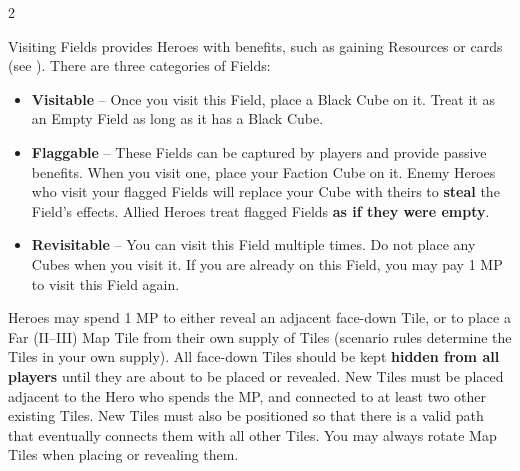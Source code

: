 \clearpage

\begin{multicols}{2}

Visiting Fields provides Heroes with benefits, such as gaining Resources or cards (see ).
There are three categories of Fields:
\begin{itemize}
  \item \textbf{Visitable} – Once you visit this Field, place a Black Cube on it.
    Treat it as an Empty Field as long as it has a Black Cube.
  \item \textbf{Flaggable} – These Fields can be captured by players and provide passive benefits.
    When you visit one, place your Faction Cube on it.
    Enemy Heroes who visit your flagged Fields will replace your Cube with theirs to \textbf{steal} the Field’s effects.
    Allied Heroes treat flagged Fields \textbf{as if they were empty}.
  \item \textbf{Revisitable} – You can visit this Field multiple times.
    Do not place any Cubes when you visit it.
    If you are already on this Field, you may pay 1 MP to visit this Field again.
\end{itemize}
\vspace*{\fill}
\columnbreak

Heroes may spend 1 MP to either reveal an adjacent face-down Tile, or to place a Far (II–III) Map Tile from their own supply of Tiles (scenario rules determine the Tiles in your own supply).
All face-down Tiles should be kept \textbf{hidden from all players} until they are about to be placed or revealed.
New Tiles must be placed adjacent to the Hero who spends the MP, and connected to at least two other existing Tiles.
New Tiles must also be positioned so that there is a valid path that eventually connects them with all other Tiles.
You may always rotate Map Tiles when placing or revealing them.

\medskip
{}

\end{multicols}

